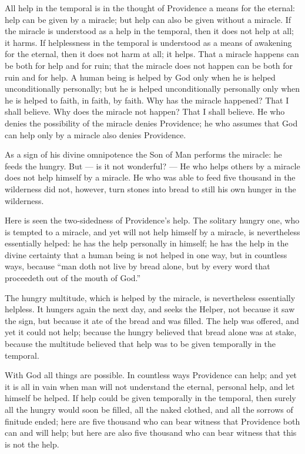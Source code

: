 \documentclass[12pt,a4paper,openany]{book}
\newcommand{\opage}[1]{\marginnote{\footnotesize\textit{[#1]}}}
\begin{document}
All help in the temporal is in the thought of Providence
a means for the eternal: help can be given
by a miracle; but help can also be given
without a miracle. If the miracle is understood as
a help in the temporal, then it does not help at all;
it harms. If helplessness in the
temporal is understood as a means of awakening for the
eternal, then it does not harm at all; it helps.
That a miracle happens can be both for
help and for ruin; that the miracle does not happen
can be both for ruin and for help.
\setcounter{footnote}{0}%
\opage{44}A human being is helped by God only when he is
helped unconditionally personally; but he is helped
unconditionally personally only when he is helped to
faith, in faith, by faith. Why has the
miracle happened? That I shall believe. Why
does the miracle not happen? That I shall believe. He
who denies the possibility of the miracle denies Providence;
he who assumes that God can help only
by a miracle also denies Providence.

As a sign of his divine omnipotence
the Son of Man performs the miracle:
he feeds the hungry. But --- is it not
wonderful? --- He who helps others by  %
a miracle does not help himself by a miracle.
He who was able to feed five thousand
in the wilderness did not, however, turn stones into bread
to still his own hunger in the wilderness.

Here is seen the two-sidedness of Providence's help.
The solitary hungry one, who is tempted to a miracle,
and yet will not help himself by a miracle,
is nevertheless essentially helped: he has
the help personally in himself; he has the help
in the divine certainty that a human being
is not helped in one way, but in countless ways,
because ``man doth not live by bread alone,
\setcounter{footnote}{0}%
\opage{45}but by every word that proceedeth out of the
mouth of God.''

The hungry multitude, which is helped
by the miracle, is nevertheless essentially helpless.
It hungers again the next day, and
seeks the Helper, not because it saw the sign,
but because it ate of the bread and was filled.
The help was offered, and yet it could not
help; because the hungry believed that bread alone
was at stake, because the multitude believed that
help was to be given temporally in the temporal.

With God all things are possible. In countless
ways Providence can help; and yet it is
all in vain when man will not
understand the eternal, personal help, and let
himself be helped. If help could be given temporally in the
temporal, then surely all the hungry would soon be filled,
all the naked clothed, and all the sorrows
of finitude ended; here are five thousand who
can bear witness that Providence both can and will
help; but here are also five thousand
who can bear witness that this is not the help.
\end{document}
